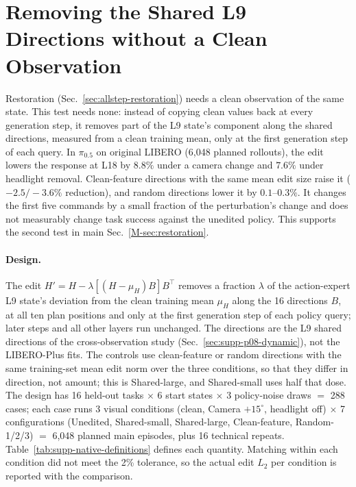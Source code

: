 \section{Removing the Shared L9 Directions without a Clean Observation}
\label{sec:supp-native-ablation}

Restoration (Sec.~\ref{sec:allstep-restoration}) needs a clean observation of the same state. This test needs none: instead of copying clean values back at every generation step, it removes part of the L9 state's component along the shared directions, measured from a clean training mean, only at the first generation step of each query. In $\pi_{0.5}$ on original LIBERO (6{,}048 planned rollouts), the edit lowers the response at L18 by $8.8\%$ under a camera change and $7.6\%$ under headlight removal. Clean-feature directions with the same mean edit size raise it ($-2.5/-3.6\%$ reduction), and random directions lower it by $0.1$--$0.3\%$. It changes the first five commands by a small fraction of the perturbation's change and does not measurably change task success against the unedited policy. This supports the second test in main Sec.~\ref*{M-sec:restoration}.

\paragraph{Design.}
The edit $H'=H-\lambda[(H-\mu_H)B]B^\top$ removes a fraction $\lambda$ of the action-expert L9 state's deviation from the clean training mean $\mu_H$ along the 16 directions $B$, at all ten plan positions and only at the first generation step of each policy query; later steps and all other layers run unchanged. The directions are the L9 shared directions of the cross-observation study (Sec.~\ref{sec:supp-p08-dynamic}), not the LIBERO-Plus fits. The controls use clean-feature or random directions with the same training-set mean edit norm over the three conditions, so that they differ in direction, not amount; this is Shared-large, and Shared-small uses half that dose. The design has 16 held-out tasks $\times$ 6 start states $\times$ 3 policy-noise draws $=$ 288 cases; each case runs 3 visual conditions (clean, Camera $+15^\circ$, headlight off) $\times$ 7 configurations (Unedited, Shared-small, Shared-large, Clean-feature, Random-1/2/3) $=$ 6{,}048 planned main episodes, plus 16 technical repeats. Table~\ref{tab:supp-native-definitions} defines each quantity. Matching within each condition did not meet the 2\% tolerance, so the actual edit $L_2$ per condition is reported with the comparison.


